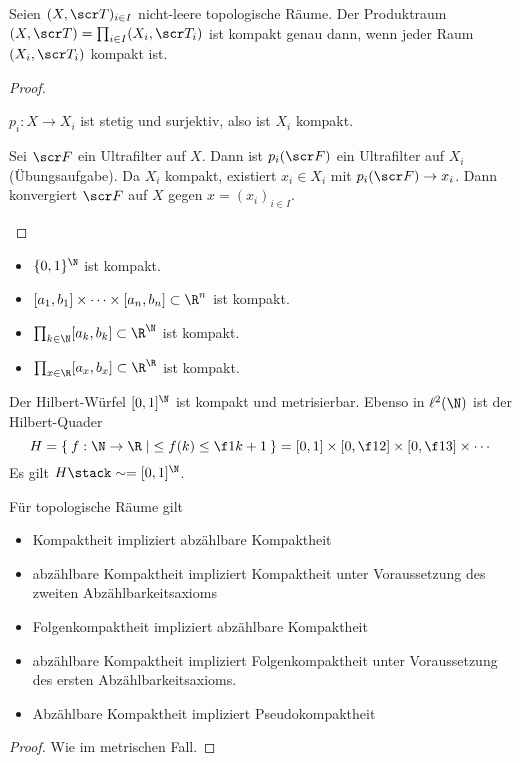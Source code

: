 \begin{st}[Tychonoff, 1930]
	Seien $(X, \scr T)_{i\in I}$ nicht-leere topologische Räume.
	Der Produktraum $(X, \scr T) = \prod_{i\in I} (X_i, \scr T_i)$ ist kompakt genau dann, wenn jeder Raum $(X_i, \scr T_i)$ kompakt ist.
	\begin{proof}
		\begin{segnb}[„$\implies$“]
			$p_i: X \to X_i$ ist stetig und surjektiv, also ist $X_i$ kompakt.
		\end{segnb}
		\begin{segnb}[„$\impliedby$“]
			Sei $\scr F$ ein Ultrafilter auf $X$.
			Dann ist $p_i(\scr F)$ ein Ultrafilter auf $X_i$ (Übungsaufgabe). %
			Da $X_i$ kompakt, existiert $x_i \in X_i$ mit $p_i(\scr F) \to x_i$.
			Dann konvergiert $\scr F$ auf $X$ gegen $x = (x_i)_{i\in I}$.
		\end{segnb}
	\end{proof}
\end{st}

\begin{ex}
	\begin{itemize}
		\item
			$\{0,1\}^\N$ ist kompakt.
		\item
			$[a_1,b_1] \times \dotsb \times [a_n,b_n] \subset \R^n$ ist kompakt.
		\item
			$\prod_{k\in\N} [a_k,b_k] \subset \R^\N$ ist kompakt.
		\item
			$\prod_{x\in\R} [a_x,b_x] \subset \R^\R$ ist kompakt.
	\end{itemize}
\end{ex}

\begin{ex}
	Der Hilbert-Würfel $[0,1]^\N$ ist kompakt und metrisierbar.
	Ebenso in $\ell^2(\N)$ ist der Hilbert-Quader
	\[
		H = \Set{ f: \N \to \R | \le f(k) \le \f 1{k+1} }
		= [0,1] \times [0,\f 12] \times [0, \f 13] \times \dotsb
	\]
	Es gilt $H \homeomorphic [0,1]^\N$.
\end{ex}

\begin{st}
	Für topologische Räume gilt
	\begin{itemize}
		\item
			Kompaktheit impliziert abzählbare Kompaktheit
		\item
			abzählbare Kompaktheit impliziert Kompaktheit unter Voraussetzung des zweiten Abzählbarkeitsaxioms
		\item
			Folgenkompaktheit impliziert abzählbare Kompaktheit
		\item
			abzählbare Kompaktheit impliziert Folgenkompaktheit unter Voraussetzung des ersten Abzählbarkeitsaxioms.
		\item
			Abzählbare Kompaktheit impliziert Pseudokompaktheit
	\end{itemize}
	\begin{proof}
		Wie im metrischen Fall.
	\end{proof}
\end{st}


